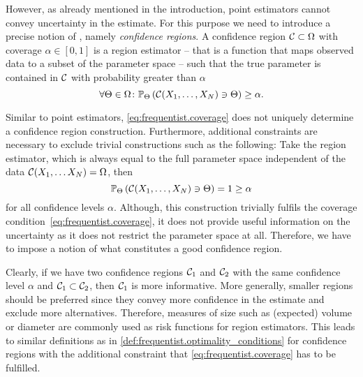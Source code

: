 However, as already mentioned in the introduction, point estimators cannot convey uncertainty in the estimate.
For this purpose we need to introduce a precise notion of , namely \emph{confidence regions}.
A confidence region $\mathcal{C} \subset \Omega$ with coverage $\alpha \in [0,1]$ is a region estimator -- that is a function that maps observed data to a subset of the parameter space -- such that the true parameter is contained in $\mathcal{C}$ with probability greater than $\alpha$
\[
  \label{eq:frequentist.coverage}
  \forall \Theta\in\Omega \colon \mathbb{P}_\Theta\left( \mathcal{C}(X_1, \ldots, X_N) \ni \Theta \right) \ge \alpha.
\]

Similar to point estimators, \cref{eq:frequentist.coverage} does not uniquely determine a confidence region construction.
Furthermore, additional constraints are necessary to exclude trivial constructions such as the following:
Take the region estimator, which is always equal to the full parameter space independent of the data $\mathcal{C}(X_1, \ldots X_N) = \Omega$, then
\[
  \mathbb{P}_\Theta\left(  \mathcal{C}(X_1, \ldots, X_N) \ni \Theta  \right) = 1 \ge \alpha
\]
for all confidence levels $\alpha$.
Although, this construction trivially fulfils the coverage condition~\eqref{eq:frequentist.coverage}, it does not provide useful information on the uncertainty as it does not restrict the parameter space at all.
Therefore, we have to impose a notion of what constitutes a good confidence region.

Clearly, if we have two confidence regions $\mathcal{C}_1$ and $\mathcal{C}_2$ with the same confidence level $\alpha$ and $\mathcal{C}_1 \subset \mathcal{C}_2$, then $\mathcal{C}_1$ is more informative.
More generally, smaller regions should be preferred since they convey more confidence in the estimate and exclude more alternatives.
Therefore, measures of size such as (expected) volume or diameter are commonly used as risk functions for region estimators.
This leads to similar definitions as in \cref{def:frequentist.optimality_conditions} for confidence regions with the additional constraint that \cref{eq:frequentist.coverage} has to be fulfilled.

